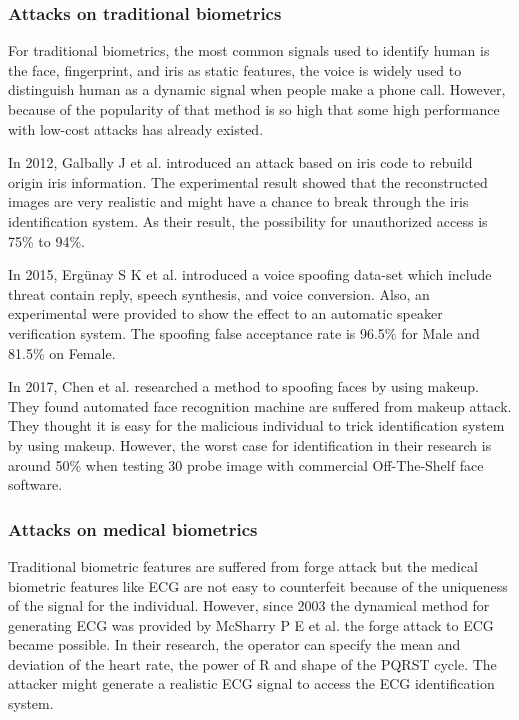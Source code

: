 \documentclass[a4paper,12pt]{article}
\begin{document}
\subsubsection{Attacks on traditional biometrics}
For traditional biometrics, the most common signals used to identify human is the face, fingerprint, and iris as static features, the voice is widely used to distinguish human as a dynamic signal when people make a phone call. However, because of the popularity of that method is so high that some high performance with low-cost attacks has already existed.

In 2012, Galbally J et al. \autocite{Galbally:2012iriscode} introduced an attack based on iris code to rebuild origin iris information. The experimental result showed that the reconstructed images are very realistic and might have a chance to break through the iris identification system. As their result, the possibility for unauthorized access is 75\% to 94\%.

In 2015, Ergünay S K et al. \autocite{Ergunay:2015voicevulnerability} introduced a voice spoofing data-set which include threat contain reply, speech synthesis, and voice conversion. Also, an experimental were provided to show the effect to an automatic speaker verification system. The spoofing false acceptance rate is 96.5\% for Male and 81.5\% on Female.

In 2017, Chen et al. \autocite{Chen:2017spoofing}researched a method to spoofing faces by using makeup. They found automated face recognition machine are suffered from makeup attack. They thought it is easy for the malicious individual to trick identification system by using makeup. However, the worst case for identification in their research is around 50\% when testing 30 probe image with commercial Off-The-Shelf face software.

\subsubsection{Attacks on medical biometrics}
Traditional biometric features are suffered from forge attack but the medical biometric features like ECG are not easy to counterfeit because of the uniqueness of the signal for the individual. However, since 2003 the dynamical method for generating ECG was provided by McSharry P E et al. \autocite{Mcsharry:2003dynamical} the forge attack to ECG became possible. In their research, the operator can specify the mean and deviation of the heart rate, the power of R and shape of the PQRST cycle. The attacker might generate a realistic ECG signal to access the ECG identification system.
\end{document}
